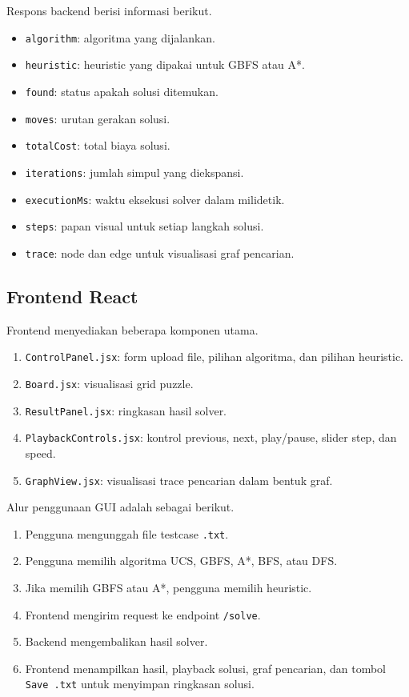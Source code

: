 Respons backend berisi informasi berikut.
\begin{itemize}[label=\textbullet]
    \item \texttt{algorithm}: algoritma yang dijalankan.
    \item \texttt{heuristic}: heuristic yang dipakai untuk GBFS atau A*.
    \item \texttt{found}: status apakah solusi ditemukan.
    \item \texttt{moves}: urutan gerakan solusi.
    \item \texttt{totalCost}: total biaya solusi.
    \item \texttt{iterations}: jumlah simpul yang diekspansi.
    \item \texttt{executionMs}: waktu eksekusi solver dalam milidetik.
    \item \texttt{steps}: papan visual untuk setiap langkah solusi.
    \item \texttt{trace}: node dan edge untuk visualisasi graf pencarian.
\end{itemize}

\subsection{Frontend React}\label{sub:Frontend React}

Frontend menyediakan beberapa komponen utama.
\begin{enumerate}
    \item \texttt{ControlPanel.jsx}: form upload file, pilihan
        algoritma, dan pilihan heuristic.
    \item \texttt{Board.jsx}: visualisasi grid puzzle.
    \item \texttt{ResultPanel.jsx}: ringkasan hasil solver.
    \item \texttt{PlaybackControls.jsx}: kontrol previous, next,
        play/pause, slider step, dan speed.
    \item \texttt{GraphView.jsx}: visualisasi trace pencarian dalam
        bentuk graf.
\end{enumerate}

Alur penggunaan GUI adalah sebagai berikut.
\begin{enumerate}
    \item Pengguna mengunggah file testcase \texttt{.txt}.
    \item Pengguna memilih algoritma UCS, GBFS, A*, BFS, atau DFS.
    \item Jika memilih GBFS atau A*, pengguna memilih heuristic.
    \item Frontend mengirim request ke endpoint \texttt{/solve}.
    \item Backend mengembalikan hasil solver.
    \item Frontend menampilkan hasil, playback solusi, graf
        pencarian, dan tombol \texttt{Save .txt} untuk menyimpan
        ringkasan solusi.
\end{enumerate}

